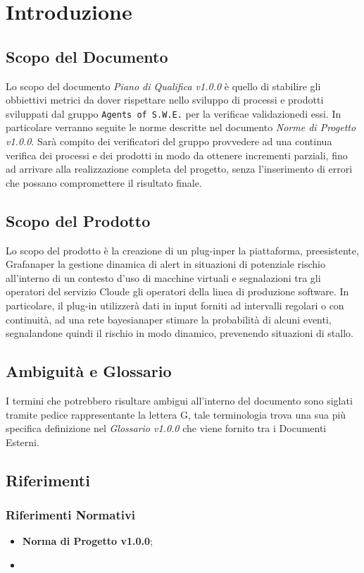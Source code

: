 \section{Introduzione}
\label{introduzione}

\subsection{Scopo del Documento}

Lo scopo del documento \textit{Piano di Qualifica v1.0.0} è quello di stabilire gli obbiettivi metrici da dover rispettare nello sviluppo di processi e prodotti sviluppati dal gruppo \texttt{Agents of S.W.E.} per la verifica\glossario e validazione\glossario di essi. In particolare verranno seguite le norme descritte nel documento \textit{Norme di Progetto v1.0.0}. Sarà compito dei verificatori del gruppo provvedere ad una continua verifica dei processi e dei prodotti in modo da ottenere incrementi parziali, fino ad arrivare alla realizzazione completa del progetto, senza l'inserimento di errori che possano compromettere il risultato finale. 

\subsection{Scopo del Prodotto}
Lo scopo del prodotto è la creazione di un plug-in\glossario  per la piattaforma, preesistente, Grafana\glossario per la gestione dinamica di alert in situazioni di potenziale rischio all’interno di un contesto d’uso di macchine virtuali e segnalazioni tra gli operatori del servizio Cloud\glossario e gli operatori della linea di produzione software. In particolare, il plug-in utilizzerà dati in input forniti ad intervalli regolari o con continuità, ad una rete bayesiana\glossario per stimare la probabilità di alcuni eventi, segnalandone quindi il rischio in modo dinamico, prevenendo situazioni di stallo.   

\subsection{Ambiguità e Glossario}
I termini che potrebbero risultare ambigui all'interno del documento sono siglati tramite pedice rappresentante la lettera \textmd{G}, tale terminologia trova una sua più specifica definizione nel \textit{Glossario v1.0.0} che viene fornito tra i Documenti Esterni.

\subsection{Riferimenti}
\subsubsection{Riferimenti Normativi}

	\begin{itemize}
		\item \textbf{Norma di Progetto v1.0.0};
		\item 
	\end{itemize}

